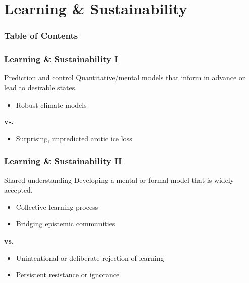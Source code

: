 
\section{Learning \& Sustainability}
\begin{frame}
	\frametitle{Table of Contents}
\end{frame}

\begin{frame}
	\frametitle{Learning \& Sustainability I}
	\begin{block}{Prediction and control}
		Quantitative/mental models that inform in advance or lead to desirable states.

		\hrulefill

		\begin{itemize}
			\item Robust climate models \citep{Manabe1967,Forster2017}
		\end{itemize}
		\centering \textbf{vs.}
		\vspace{5pt}
		\begin{itemize}
			\item Surprising, unpredicted arctic ice loss \citep{Guarino2020}
		\end{itemize}
	\end{block}
\end{frame}

\begin{frame}
	\frametitle{Learning \& Sustainability II}
	\begin{block}{Shared understanding}
		Developing a mental or formal model that is widely accepted.

		\hrulefill

		\begin{itemize}
			\item Collective learning process \citep{Wright2017}
			\item Bridging epistemic communities \citep{Aronczyk2019}
		\end{itemize}
		\centering \textbf{vs.}
		\vspace{5pt}
		\begin{itemize}
			\item Unintentional or deliberate rejection of learning \citep{Hermwille2019,Koontz2018}
			\item Persistent resistance or ignorance \citep{Boudet2020}
		\end{itemize}
	\end{block}
\end{frame}

